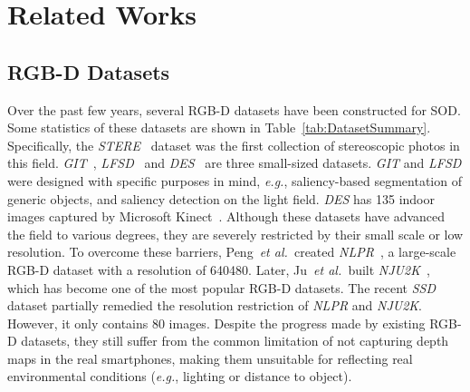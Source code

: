 \documentclass[journal]{IEEEtran}
\def\eg{\emph{e.g.}}
\def\etal{{\em et al.~}}
\newcommand{\tabref}[1]{Table~\ref{#1}}
\newcommand{\fdp}[1]{#1}
\begin{document}
\section{Related Works}\label{sec:relatedWorks}
\subsection{RGB-D Datasets}
Over the past few years, several RGB-D datasets
have been constructed for SOD. Some statistics of these datasets are
shown in \tabref{tab:DatasetSummary}.
\fdp{Specifically}, \fdp{the} \emph{STERE}~\cite{niu2012leveraging} dataset \fdp{was}
the first \fdp{collection of} stereoscopic photo\fdp{s} in this field.
\emph{GIT}~\cite{ciptadi2013depth}, \emph{LFSD}~\cite{li2014saliency}
and \emph{DES}~\cite{li2014saliency} are three \fdp{small-sized} datasets.
\emph{GIT} and \emph{LFSD} \fdp{were} designed \fdp{with} specific purposes in mind, \eg, saliency-based
segmentation of generic objects, and saliency detection on the light field.
\emph{DES} has 135 indoor images captured by Microsoft Kinect~\cite{zhang2012microsoft}.
Although \fdp{these} datasets \fdp{have} advanced the field to various degrees, they are
severely restricted by \fdp{their} small scale or low resolution.
To overcome \fdp{these} barriers, Peng~\etal created \emph{NLPR}~\cite{peng2014rgbd},
a \fdp{large-scale} RGB-D dataset with \fdp{a} resolution of 640480.
Later, Ju~\etal built \emph{NJU2K}~\cite{ju2014depth}, \fdp{which} has become one of
the most popular RGB-D datasets.
\fdp{The} recent \emph{SSD}~\cite{zhu2017three} dataset partially remedied the resolution
restriction of \emph{NLPR} and \emph{NJU2K}. \fdp{However, it only contains 80 images. Despite the progress made by existing RGB-D datasets, they
still suffer from the common limitation of not capturing depth maps in the real smartphones, making them
unsuitable for reflecting real environmental conditions (\eg, lighting or distance to object).}
\end{document}
